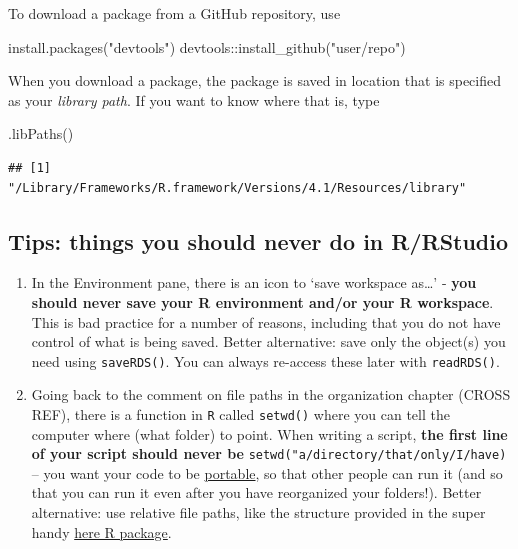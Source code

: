 \documentclass[
]{book}
\newenvironment{Shaded}{\begin{snugshade}}{\end{snugshade}}
\newcommand{\FunctionTok}[1]{\textcolor[rgb]{0.00,0.00,0.00}{#1}}
\newcommand{\NormalTok}[1]{#1}
\newcommand{\SpecialCharTok}[1]{\textcolor[rgb]{0.00,0.00,0.00}{#1}}
\newcommand{\StringTok}[1]{\textcolor[rgb]{0.31,0.60,0.02}{#1}}
\begin{document}
To download a package from a GitHub repository, use

\begin{Shaded}
\begin{Highlighting}[]
\FunctionTok{install.packages}\NormalTok{(}\StringTok{"devtools"}\NormalTok{)}
\NormalTok{devtools}\SpecialCharTok{::}\FunctionTok{install\_github}\NormalTok{(}\StringTok{"user/repo"}\NormalTok{)}
\end{Highlighting}
\end{Shaded}

When you download a package, the package is saved in location that is specified as your \emph{library path}. If you want to know where that is, type

\begin{Shaded}
\begin{Highlighting}[]
\FunctionTok{.libPaths}\NormalTok{()}
\end{Highlighting}
\end{Shaded}

\begin{verbatim}
## [1] "/Library/Frameworks/R.framework/Versions/4.1/Resources/library"
\end{verbatim}

\hypertarget{tips-things-you-should-never-do-in-rrstudio}{%
\subsection{Tips: things you should never do in R/RStudio}\label{tips-things-you-should-never-do-in-rrstudio}}

\begin{enumerate}
\def\labelenumi{\arabic{enumi}.}
\item
  In the Environment pane, there is an icon to `save workspace as\ldots{}' - \textbf{you should never save your R environment and/or your R workspace}. This is bad practice for a number of reasons, including that you do not have control of what is being saved. Better alternative: save only the object(s) you need using \texttt{saveRDS()}. You can always re-access these later with \texttt{readRDS()}.
\item
  Going back to the comment on file paths in the organization chapter (CROSS REF), there is a function in \texttt{R} called \texttt{setwd()} where you can tell the computer where (what folder) to point. When writing a script, \textbf{the first line of your script should never be} \texttt{setwd("a/directory/that/only/I/have)} -- you want your code to be \href{https://www.techtarget.com/searchstorage/definition/portability\#:~:text=Source\%20code\%20portability\%20refers\%20to,or\%20data\%20center\%20to\%20another.}{portable}, so that other people can run it (and so that you can run it even after you have reorganized your folders!). Better alternative: use relative file paths, like the structure provided in the super handy \href{https://here.r-lib.org/}{here R package}.
\end{enumerate}
\end{document}
